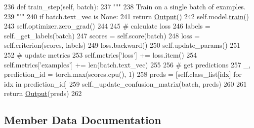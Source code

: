 \begin{DoxyCode}
236     \textcolor{keyword}{def }train\_step(self, batch):
237         \textcolor{stringliteral}{"""}
238 \textcolor{stringliteral}{        Train on a single batch of examples.}
239 \textcolor{stringliteral}{        """}
240         \textcolor{keywordflow}{if} batch.text\_vec \textcolor{keywordflow}{is} \textcolor{keywordtype}{None}:
241             \textcolor{keywordflow}{return} \hyperlink{namespaceparlai_1_1agents_1_1legacy__agents_1_1seq2seq_1_1torch__agent__v1_a2689006ea97d09413fb242f984bd8016}{Output}()
242         self.model.\hyperlink{namespaceprojects_1_1mastering__the__dungeon_1_1mturk_1_1tasks_1_1MTD_1_1run_a36a5f4f6f9df0611a6818610518d2cf0}{train}()
243         self.optimizer.zero\_grad()
244 
245         \textcolor{comment}{# calculate loss}
246         labels = self.\_get\_labels(batch)
247         scores = self.score(batch)
248         loss = self.criterion(scores, labels)
249         loss.backward()
250         self.update\_params()
251 
252         \textcolor{comment}{# update metrics}
253         self.metrics[\textcolor{stringliteral}{'loss'}] += loss.item()
254         self.metrics[\textcolor{stringliteral}{'examples'}] += len(batch.text\_vec)
255 
256         \textcolor{comment}{# get predictions}
257         \_, prediction\_id = torch.max(scores.cpu(), 1)
258         preds = [self.class\_list[idx] \textcolor{keywordflow}{for} idx \textcolor{keywordflow}{in} prediction\_id]
259         self.\_update\_confusion\_matrix(batch, preds)
260 
261         \textcolor{keywordflow}{return} \hyperlink{namespaceparlai_1_1agents_1_1legacy__agents_1_1seq2seq_1_1torch__agent__v1_a2689006ea97d09413fb242f984bd8016}{Output}(preds)
262 
\end{DoxyCode}


\subsection{Member Data Documentation}
\mbox{\label{classparlai_1_1core_1_1torch__classifier__agent_1_1TorchClassifierAgent_a80b1b3e0162c2dca36a1e1763cf3cad9}} 
